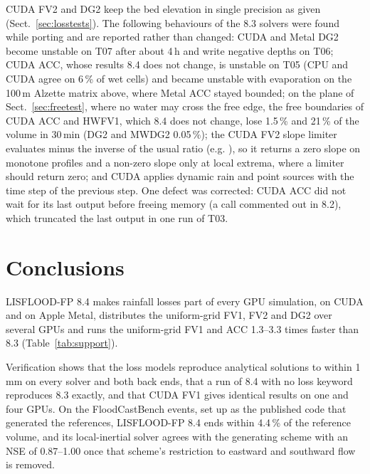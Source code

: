 \documentclass[draft,linenumbers]{agujournal2025}
\begin{document}
CUDA FV2 and DG2 keep the bed elevation in single precision as given
(Sect.~\ref{sec:losstests}). The following behaviours of the 8.3 solvers were
found while porting and are reported rather than changed: CUDA and Metal DG2
become unstable on T07 after about 4\,h and write negative depths on T06;
CUDA ACC, whose results 8.4 does not change, is unstable on T05 (CPU and CUDA
agree on 6\,\% of wet cells) and became unstable with evaporation on the
100\,m Alzette matrix above, where Metal ACC stayed bounded; on the plane of
Sect.~\ref{sec:freetest}, where no water may cross the free edge, the free
boundaries of CUDA ACC and HWFV1, which 8.4 does not change, lose 1.5\,\% and
21\,\% of the volume in 30\,min (DG2 and MWDG2 0.05\,\%); the CUDA FV2
slope limiter evaluates minus the inverse of the usual ratio (e.g.
), so it returns a zero slope on
monotone profiles and a non-zero slope only at local extrema, where a limiter
should return zero; and CUDA applies dynamic rain
and point sources with the time step of the previous step. One defect was
corrected: CUDA ACC did not wait for its last output before freeing memory (a
call commented out in 8.2), which truncated the last output in one run of
T03.

\section{Conclusions}

LISFLOOD-FP 8.4 makes rainfall losses part of every GPU simulation, on CUDA
and on Apple Metal, distributes the uniform-grid FV1, FV2 and DG2 over
several GPUs and runs the uniform-grid FV1 and ACC 1.3--3.3 times faster
than 8.3 (Table~\ref{tab:support}).

Verification shows that the loss models reproduce analytical solutions to
within 1\,mm on every solver and both back ends, that a run of 8.4 with no
loss keyword reproduces 8.3 exactly, and that CUDA FV1 gives identical results on one and four
GPUs. On the
FloodCastBench events, set up as the published code that generated the
references, LISFLOOD-FP 8.4 ends within 4.4\,\% of the reference volume, and
its local-inertial solver agrees with the generating scheme with an NSE of
0.87--1.00 once that scheme's restriction to eastward and southward flow is
removed.
\end{document}
